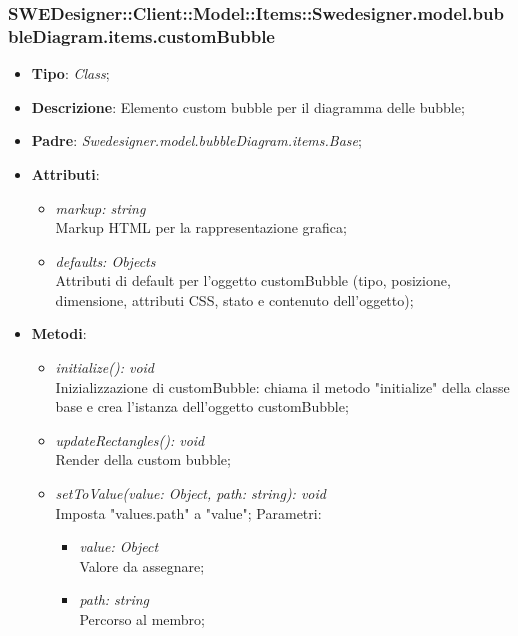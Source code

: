 \documentclass[../DefinizioneDiProdotto.tex]{subfiles}
\begin{document}
			\subsubsection{SWEDesigner::Client::Model::Items::Swedesigner.model.bubbleDiagram.items.customBubble}
			\hypertarget{SWEDesigner::Client::Model::Items::Swedesigner.model.bubbleDiagram.items.customBubble}{}
			\begin{itemize}
				\item \textbf{Tipo}: \emph{Class};
				\item \textbf{Descrizione}: Elemento custom bubble per il diagramma delle bubble;
				\item \textbf{Padre}: \emph{Swedesigner.model.bubbleDiagram.items.Base};
				\item \textbf{Attributi}:
				\begin{itemize}
					\item \emph{markup: string}\\
					Markup HTML per la rappresentazione grafica;
					\item \emph{defaults: Objects}\\
					Attributi di default per l'oggetto customBubble (tipo, posizione, dimensione, attributi CSS, stato e contenuto dell'oggetto);
				\end{itemize}
				\item \textbf{Metodi}:
				\begin{itemize}
					\item \emph{initialize(): void}\\
					Inizializzazione di customBubble: chiama il metodo "initialize" della classe base e crea l'istanza dell'oggetto customBubble;
					\item \emph{updateRectangles(): void}\\
					Render della custom bubble;
					\item \emph{setToValue(value: Object, path: string): void}\\
					Imposta "values.path" a "value";
					Parametri:
					\begin{itemize}
						\item \emph{value: Object} \\
						Valore da assegnare;
						\item \emph{path: string} \\
						Percorso al membro;
					\end{itemize}
				\end{itemize}
			\end{itemize}
			
\end{document}
